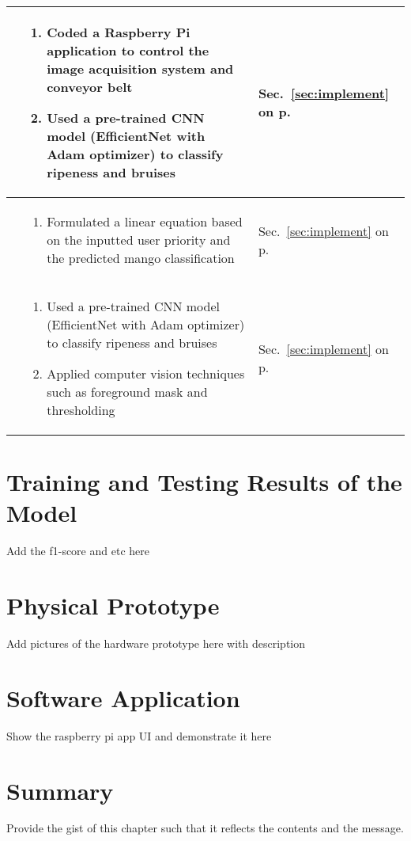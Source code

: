 \begin{center}
{\begin{tabularx}{\textwidth}{p{}|p{}|p{}}
			\Paste{SO3} & \begin{enumerate}
				\item Coded a Raspberry Pi application to control the image acquisition system and conveyor belt
				\item Used a pre-trained CNN model (EfficientNet with Adam optimizer) to classify ripeness and bruises
			\end{enumerate} & Sec.~\ref{sec:implement} on p.~\pageref{sec:implement} \\ \hline
			
			\Paste{SO4} & \begin{enumerate}
				\item Formulated a linear equation based on the inputted user priority and the predicted mango classification
			\end{enumerate} & Sec.~\ref{sec:implement} on p.~\pageref{sec:implement} \\ \hline
			
			\Paste{SO5} & \begin{enumerate}
				\item Used a pre-trained CNN model (EfficientNet with Adam optimizer) to classify ripeness and bruises
				\item Applied computer vision techniques such as foreground mask and thresholding
			\end{enumerate} & Sec.~\ref{sec:implement} on p.~\pageref{sec:implement} \\ \hline
			
		\end{tabularx}
	}
\end{center}

\section{Training and Testing Results of the Model}

Add the f1-score and etc here

\section{Physical Prototype}

Add pictures of the hardware prototype here with description

\section{Software Application}

Show the raspberry pi app UI and demonstrate it here 

\section{Summary}

Provide the gist of this chapter such that it reflects the contents and the message.